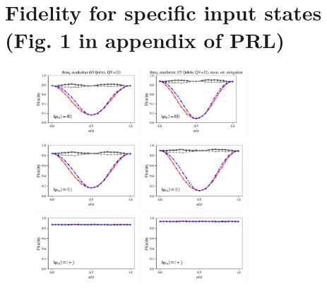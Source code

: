 \documentclass[a4paper]{article}
\begin{document}
\newpage
\section*{Fidelity for specific input states (Fig. 1 in appendix of PRL)}
\begin{figure}[H]
	\centering
	\includegraphics[width=0.35\textwidth]{fidelity_qc0_mit1_state0}
	\includegraphics[width=0.35\textwidth]{fidelity_qc0_mit0_state0}
	\\
	\includegraphics[width=0.35\textwidth]{fidelity_qc0_mit1_state1}
	\includegraphics[width=0.35\textwidth]{fidelity_qc0_mit0_state1}
	\\
	\includegraphics[width=0.35\textwidth]{fidelity_qc0_mit1_state2}
	\includegraphics[width=0.35\textwidth]{fidelity_qc0_mit0_state2}

\end{figure}
\end{document}
